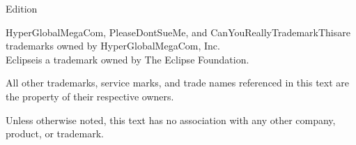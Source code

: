 

\thispagestyle{empty}
\license
\vspace{1in}
\begin{center}
Edition\\
\vspace{0.5in}
\end{center}

\vfill

{\tiny HyperGlobalMegaCom\tm, PleaseDontSueMe\tm, and CanYouReallyTrademarkThis\tm are trademarks owned by HyperGlobalMegaCom, Inc.\\
Eclipse\tm is a trademark owned by The Eclipse Foundation.

All other trademarks, service marks, and trade names referenced in this text are the property of their respective owners.

Unless otherwise noted, this text has no association with any other company, product, or trademark.} 
